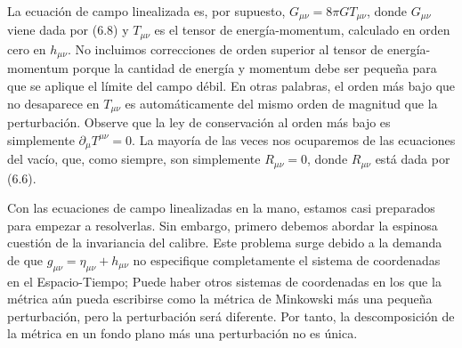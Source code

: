 \documentclass[11pt,b5paper,openany,twoside]{book}
\newcommand{\mn}{{\mu\nu}}
\newcommand{\p}[1]{{\partial_{#1}}}
\begin{document}
La ecuación de campo linealizada es, por supuesto, $G_\mn=8\pi GT_\mn$, donde $G_\mn$ viene dada por (6.8) y $T_\mn$ es el tensor de energía-momentum, calculado en orden cero en $h_\mn$.
No incluimos correcciones de orden superior al tensor de energía-momentum porque la cantidad de energía y momentum debe ser pequeña para que se aplique el límite del campo débil.
En otras palabras, el orden más bajo que no desaparece en $T_\mn$ es automáticamente del mismo orden de magnitud que la perturbación.
Observe que la ley de conservación al orden más bajo es simplemente $\p\mu T^\mn=0$.
La mayoría de las veces nos ocuparemos de las ecuaciones del vacío, que, como siempre, son simplemente $R_\mn=0$, donde $R_\mn$ está dada por (6.6).

Con las ecuaciones de campo linealizadas en la mano, estamos casi preparados para empezar a resolverlas.
Sin embargo, primero debemos abordar la espinosa cuestión de la invariancia del calibre.
Este problema surge debido a la demanda de que $g_\mn=\eta_\mn+h_\mn$ no especifique completamente el sistema de coordenadas en el Espacio-Tiempo; Puede haber otros sistemas de coordenadas en los que la métrica aún pueda escribirse como la métrica de Minkowski más una pequeña perturbación, pero la perturbación será diferente.
Por tanto, la descomposición de la métrica en un fondo plano más una perturbación no es única.
\end{document}
